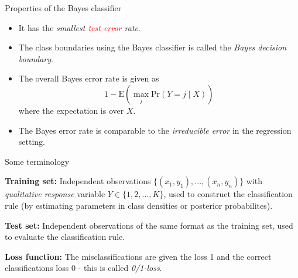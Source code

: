 \documentclass[10pt,ignorenonframetext,]{beamer}
\begin{document}
\begin{frame}

\begin{block}{Properties of the Bayes classifier}

\vspace{2mm}

\begin{itemize}
\item
  It has the \emph{smallest \textcolor{red}{test error} rate}.
\item
  The class boundaries using the Bayes classifier is called the
  \emph{Bayes decision boundary}.
\item
  The overall Bayes error rate is given as
  \[1-\text{E}(\max_j \text{Pr}(Y=j\mid X))\] where the expectation is
  over \(X\).
\item
  The Bayes error rate is comparable to the \emph{irreducible error} in
  the regression setting.
\end{itemize}

\end{block}

\end{frame}

\begin{frame}{Some terminology}

\vspace{2mm}

\textbf{Training set:} Independent observations
\(\{(x_1, y_1), ..., (x_n, y_n)\}\) with \emph{qualitative response}
variable \(Y \in \{1, 2, ..., K\}\), used to construct the
classification rule (by estimating parameters in class densities or
posterior probabilites).

\vspace{2mm}

\textbf{Test set:} Independent observations of the same format as the
training set, used to evaluate the classification rule.

\vspace{2mm}

\textbf{Loss function:} The misclassifications are given the loss 1 and
the correct classifications loss 0 - this is called \emph{0/1-loss}.

\end{frame}
\end{document}
